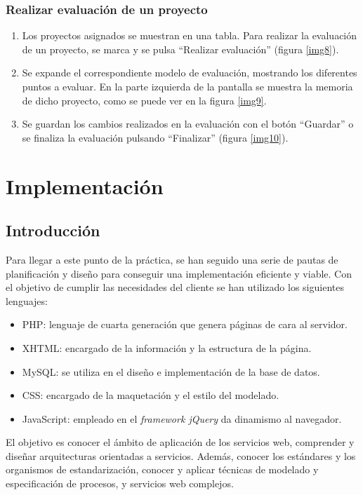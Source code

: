 \documentclass[12pt,a4paper,titlepage,spanish,twoside]{book}
\begin{document}
\subsection{Realizar evaluación de un proyecto}
\begin{enumerate}
\item Los proyectos asignados se muestran en una tabla. Para realizar la 
  evaluación de un proyecto, se marca y se pulsa ``Realizar evaluación''
  (figura \ref{img8}). 


\item Se expande el correspondiente modelo de evaluación, mostrando los 
  diferentes puntos a evaluar. En la parte izquierda de la pantalla se
  muestra la memoria de dicho proyecto, como se puede ver en la figura
  \ref{img9}. 


\item Se guardan los cambios realizados en la evaluación con el botón 
  ``Guardar'' o se finaliza la evaluación pulsando ``Finalizar'' (figura 
  \ref{img10}).
  
\end{enumerate}

\chapter{Implementación}
\section{Introducción}
Para llegar a este punto de la práctica, se han seguido una serie de pautas de
planificación y diseño para conseguir una implementación eficiente y viable.
Con el objetivo de cumplir las necesidades del cliente se han utilizado los
siguientes lenguajes:
\begin{itemize}
\item PHP\cite{achour}: lenguaje de cuarta generación que genera páginas de cara
al servidor.
\item XHTML\cite{wc}: encargado de la información y la estructura de la página.
\item MySQL: se utiliza en el diseño e implementación de la base de datos.
\item CSS\cite{wc}: encargado de la maquetación y el estilo del modelado.
\item JavaScript\cite{resig}: empleado en el \emph{framework jQuery} da 
dinamismo al navegador.
\end{itemize} 
El objetivo es conocer el ámbito de aplicación de los servicios web, comprender 
y diseñar arquitecturas orientadas a servicios. Además, conocer los estándares y
los organismos de estandarización, conocer y aplicar técnicas de modelado y 
especificación de procesos, y servicios web complejos.
\end{document}
